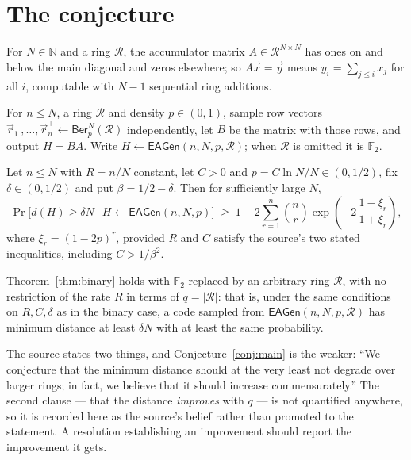 \documentclass{aicr-conjecture}
\newcommand{\F}{\mathbb{F}}
\newcommand{\Ring}{\mathcal{R}}
\newcommand{\Ber}{\mathsf{Ber}}
\newcommand{\EAGen}{\mathsf{EAGen}}
\newcommand{\dmin}{d}
\begin{document}
\section{The conjecture}\label{sec:conjectures}

\begin{definition}\label{def:acc}
For $N \in \mathbb{N}$ and a ring $\Ring$, the accumulator matrix $A \in
\Ring^{N\times N}$ has ones on and below the main diagonal and zeros
elsewhere; so $A\vec{x} = \vec{y}$ means $y_{i} = \sum_{j \le i} x_{j}$
for all $i$, computable with $N-1$ sequential ring additions.
\end{definition}

\begin{definition}\label{def:ea}
For $n \le N$, a ring $\Ring$ and density $p \in (0,1)$, sample row
vectors $\vec{r}_{1}^{\top}, \dots, \vec{r}_{n}^{\top} \leftarrow
\Ber_{p}^{N}(\Ring)$ independently, let $B$ be the matrix with those
rows, and output $H = BA$. Write $H \leftarrow \EAGen(n, N, p, \Ring)$;
when $\Ring$ is omitted it is $\F_{2}$.
\end{definition}

\begin{theorem}[What is proved, over $\F_{2}$ only,
  {\cite[Theorem 3.10]{BCGIKRS22}}]\label{thm:binary}
Let $n \le N$ with $R = n/N$ constant, let $C > 0$ and $p = C\ln N/N \in
(0,1/2)$, fix $\delta \in (0,1/2)$ and put $\beta = 1/2 - \delta$. Then
for sufficiently large $N$,
\[
  \Pr\bigl[ \dmin(H) \ge \delta N \ \big|\ H \leftarrow \EAGen(n,N,p)
  \bigr] \;\ge\; 1 - 2\sum_{r=1}^{n} \binom{n}{r}
  \exp\!\left(-2\,\frac{1-\xi_{r}}{1+\xi_{r}}\right),
\]
where $\xi_{r} = (1-2p)^{r}$, provided $R$ and $C$ satisfy the source's
two stated inequalities, including $C > 1/\beta^{2}$.
\end{theorem}

\begin{conjecture}\label{conj:main}
Theorem~\ref{thm:binary} holds with $\F_{2}$ replaced by an arbitrary
ring $\Ring$, with no restriction of the rate $R$ in terms of $q =
|\Ring|$: that is, under the same conditions on $R, C, \delta$ as in the
binary case, a code sampled from $\EAGen(n,N,p,\Ring)$ has minimum
distance at least $\delta N$ with at least the same probability.
\end{conjecture}

\begin{remark}
The source states two things, and Conjecture~\ref{conj:main} is the
weaker: ``We conjecture that the minimum distance should at the very
least not degrade over larger rings; in fact, we believe that it should
increase commensurately.'' The second clause --- that the distance
\emph{improves} with $q$ --- is not quantified anywhere, so it is recorded
here as the source's belief rather than promoted to the statement. A
resolution establishing an improvement should report the improvement it
gets.
\end{remark}
\end{document}
